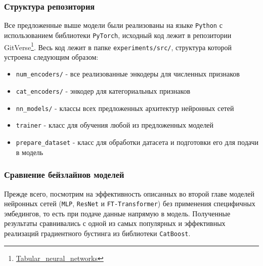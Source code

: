 \documentclass[12pt]{article}
\begin{document}
\subsubsection{Структура репозитория}

Все предложенные выше модели были реализованы на языке \texttt{Python} с использованием библиотеки \texttt{PyTorch}, исходный код лежит в репозитории GitVerse\footnote{\href{https://gitverse.ru/tsarevivan/Tabular_neural_networks/content/master}{Tabular\_neural\_networks}}. Весь код лежит в папке \texttt{experiments/src/}, структура которой устроена следующим образом:

\begin{itemize}
    \item \texttt{num\_encoders/} - все реализованные энкодеры для численных признаков
    
    \item \texttt{cat\_encoders/} - энкодер для категориальных признаков

    \item \texttt{nn\_models/} - классы всех предложенных архитектур нейронных сетей

    \item \texttt{trainer} - класс для обучения любой из предложенных моделей

    \item \texttt{prepare\_dataset} - класс для обработки датасета и подготовки его для подачи в модель
\end{itemize}

\subsubsection{Сравнение бейзлайнов моделей}

\noindent Прежде всего, посмотрим на эффективность описанных во второй главе моделей нейронных сетей (\texttt{MLP}, \texttt{ResNet} и \texttt{FT-Transformer}) без применения специфичных эмбедингов, то есть при подаче данные напрямую в модель. Полученные результаты сравнивались с одной из самых популярных и эффективных реализаций градиентного бустинга из библиотеки \texttt{CatBoost}.
\end{document}
